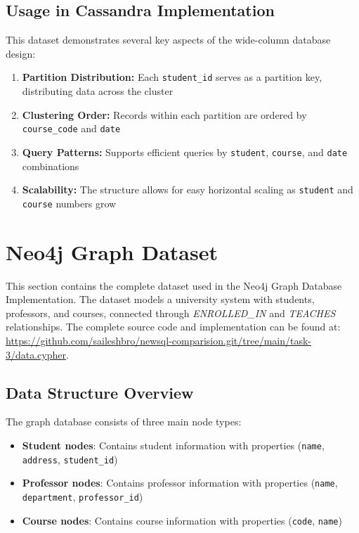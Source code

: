 \subsection{Usage in Cassandra Implementation}

This dataset demonstrates several key aspects of the wide-column database design:

\begin{enumerate}
    \item \textbf{Partition Distribution:} Each \texttt{student\_id} serves as a partition key, distributing data across the cluster
    \item \textbf{Clustering Order:} Records within each partition are ordered by \texttt{course\_code} and \texttt{date}
    \item \textbf{Query Patterns:} Supports efficient queries by \texttt{student}, \texttt{course}, and \texttt{date} combinations
    \item \textbf{Scalability:} The structure allows for easy horizontal scaling as \texttt{student} and \texttt{course} numbers grow
\end{enumerate}

\section{Neo4j Graph Dataset}

This section contains the complete dataset used in the Neo4j Graph Database Implementation. The dataset models a university system with students, professors, and courses, connected through \textit{ENROLLED\_IN} and \textit{TEACHES} relationships. The complete source code and implementation can be found at: \url{https://github.com/saileshbro/newsql-comparision.git/tree/main/task-3/data.cypher}.

\subsection{Data Structure Overview}

The graph database consists of three main node types:
\begin{itemize}
    \item \textbf{Student nodes}: Contains student information with properties (\texttt{name}, \texttt{address}, \texttt{student\_id})
    \item \textbf{Professor nodes}: Contains professor information with properties (\texttt{name}, \texttt{department}, \texttt{professor\_id})
    \item \textbf{Course nodes}: Contains course information with properties (\texttt{code}, \texttt{name})
\end{itemize}

